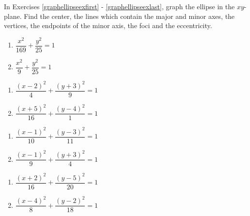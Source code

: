\label{ExercisesforEllipses}

In Exercises \ref{graphellipseexfirst} - \ref{graphellipseexlast},  graph the ellipse in the $xy$-plane.  Find the center, the lines which contain the major and minor axes, the vertices, the endpoints of the minor axis, the foci and the eccentricity.

\begin{multicols}{2}
\begin{enumerate}

\item $\dfrac{x^{2}}{169} + \dfrac{y^{2}}{25} = 1$  \label{graphellipseexfirst} \label{oddellipseone}
\item $\dfrac{x^2}{9} + \dfrac{y^2}{25} = 1$



\setcounter{HW}{\value{enumi}}
\end{enumerate}
\end{multicols}

\begin{multicols}{2}
\begin{enumerate}
\setcounter{enumi}{\value{HW}}

\item $\dfrac{(x - 2)^{2}}{4} + \dfrac{(y + 3)^{2}}{9} = 1$   \label{oddellipsethree}
\item $\dfrac{(x + 5)^{2}}{16} + \dfrac{(y - 4)^{2}}{1} = 1$


\setcounter{HW}{\value{enumi}}
\end{enumerate}
\end{multicols}

\begin{multicols}{2}
\begin{enumerate}
\setcounter{enumi}{\value{HW}}

\item $\dfrac{(x - 1)^{2}}{10} + \dfrac{(y - 3)^{2}}{11} = 1$   \label{oddellipsefive}
\item $\dfrac{(x-1)^2}{9}+\dfrac{(y+3)^2}{4} = 1$


\setcounter{HW}{\value{enumi}}
\end{enumerate}
\end{multicols}

\begin{multicols}{2}
\begin{enumerate}
\setcounter{enumi}{\value{HW}}

\item $\dfrac{(x+2)^2}{16}+\dfrac{(y-5)^2}{20} = 1$   \label{oddellipseseven}
\item $\dfrac{(x-4)^2}{8} + \dfrac{(y-2)^2}{18} = 1$ \label{graphellipseexlast}

\setcounter{HW}{\value{enumi}}
\end{enumerate}
\end{multicols}

